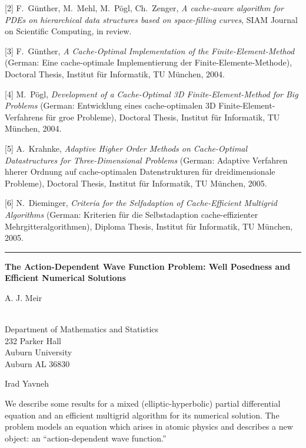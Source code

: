 \documentclass[twosided]{report}
\begin{document}
[2] F.~G\"{u}nther, M.~Mehl, M.~P\"{o}gl, Ch.~Zenger,
{\em A cache-aware
algorithm for PDEs on hierarchical data structures based on
space-filling curves}, SIAM Journal on Scientific Computing,
in review.

[3] F.~G\"{u}nther,
{\em A Cache-Optimal Implementation of the
Finite-Element-Method} (German: Eine cache-optimale
Implementierung der Finite-Elemente-Methode), Doctoral
Thesis, Institut f\"{u}r Informatik, TU M\"{u}nchen, 2004.

[4] M.~P\"{o}gl,
{\em Development of a Cache-Optimal 3D
Finite-Element-Method for Big Problems} (German:
Entwicklung eines cache-optimalen 3D
Finite-Element-Verfahrens f\"{u}r groe Probleme),
Doctoral Thesis, Institut f\"{u}r Informatik, TU
M\"{u}nchen, 2004.

[5] A.~Krahnke,
{\em Adaptive Higher Order Methods on Cache-Optimal
Datastructures for Three-Dimensional Problems} (German:
Adaptive Verfahren hherer Ordnung auf cache-optimalen
Datenstrukturen f\"{u}r dreidimensionale Probleme),
Doctoral Thesis, Institut f\"{u}r Informatik, TU
M\"{u}nchen, 2005.

[6] N.~Dieminger,
{\em Criteria for the Selfadaption of
Cache-Efficient Multigrid Algorithms} (German: Kriterien
f\"{u}r die Selbstadaption cache-effizienter
Mehrgitteralgorithmen), Diploma Thesis, Institut f\"{u}r
Informatik, TU M\"{u}nchen, 2005.


\begin{center}

\rule{6in}{1pt}
\end{center}

\begin{center}
{\large			\label{meir}
{\bf
The Action-Dependent Wave Function Problem: Well Posedness and
Efficient Numerical Solutions
}

A. J. Meir} \\
Department of Mathematics and Statistics \\
232 Parker Hall \\
Auburn University \\
Auburn AL 36830

Irad Yavneh
\end{center}


We describe some results for a mixed (elliptic-hyperbolic) partial
differential equation and an efficient multigrid algorithm for its
numerical solution. The problem models an equation which arises in
atomic physics and describes a new object: an ``action-dependent wave
function.''
\end{document}
